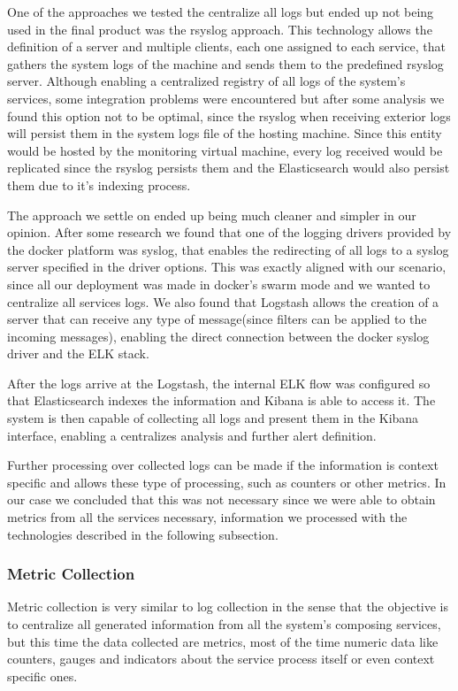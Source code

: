 \documentclass[12pt]{article}
\begin{document}
One of the approaches we tested the centralize all logs but ended up not being used in the final product was the rsyslog approach. This technology allows the definition of a server and multiple clients, each one assigned to each service, that gathers the system logs of the machine and sends them to the predefined rsyslog server. Although enabling a centralized registry of all logs of the system's services, some integration problems were encountered but after some analysis we found this option not to be optimal, since the rsyslog when receiving exterior logs will persist them in the system logs file of the hosting machine. Since this entity would be hosted by the monitoring virtual machine, every log received would be replicated since the rsyslog persists them and the Elasticsearch would also persist them due to it's indexing process.

The approach we settle on ended up being much cleaner and simpler in our opinion. After some research we found that one of the logging drivers provided by the docker platform was syslog, that enables the redirecting of all logs to a syslog server specified in the driver options. This was exactly aligned with our scenario, since all our deployment was made in docker's swarm mode and we wanted to centralize all services logs. We also found that Logstash allows the creation of a server that can receive any type of message(since filters can be applied to the incoming messages), enabling the direct connection between the docker syslog driver and the ELK stack.

After the logs arrive at the Logstash, the internal ELK flow was configured so that Elasticsearch indexes the information and Kibana is able to access it. The system is then capable of collecting all logs and present them in the Kibana interface, enabling a centralizes analysis and further alert definition.

Further processing over collected logs can be made if the information is context specific and allows these type of processing, such as counters or other metrics. In our case we concluded that this was not necessary since we were able to obtain metrics from all the services necessary, information we processed with the technologies described in the following subsection.

\subsubsection{Metric Collection}
Metric collection is very similar to log collection in the sense that the objective is to centralize all generated information from all the system's composing services, but this time the data collected are metrics, most of the time numeric data like counters, gauges and indicators about the service process itself or even context specific ones.
\end{document}

